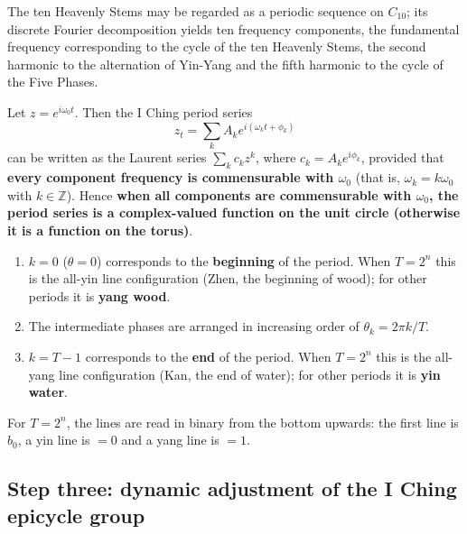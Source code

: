 \begin{example}\label{ex:yijing_tiangan_series}
The ten Heavenly Stems may be regarded as a periodic sequence on $C_{10}$; its discrete Fourier decomposition yields ten frequency components, the fundamental frequency corresponding to the cycle of the ten Heavenly Stems, the second harmonic to the alternation of Yin-Yang and the fifth harmonic to the cycle of the Five Phases.
\end{example}

\begin{remark}\label{rem:yijing_series_complex}
Let $z=e^{i\omega_0t}$. Then the I Ching period series
\[
z_t=\sum_k A_k e^{i(\omega_k t+\phi_k)}
\]
can be written as the Laurent series $\sum_k c_k z^k$, where $c_k=A_k e^{i\phi_k}$, provided that \textbf{every component frequency is commensurable with $\omega_0$} (that is, $\omega_k=k\omega_0$ with $k\in\mathbb Z$). Hence \textbf{when all components are commensurable with $\omega_0$, the period series is a complex-valued function on the unit circle (otherwise it is a function on the torus)}.
\end{remark}

\begin{definition}\label{def:unified_ordering}
\begin{enumerate}[label=(\roman*)]
    \item $k=0$ ($\theta=0$) corresponds to the \textbf{beginning} of the period. When $T=2^n$ this is the all-yin line configuration (Zhen, the beginning of wood); for other periods it is \textbf{yang wood}.
    \item The intermediate phases are arranged in increasing order of $\theta_k = 2\pi k/T$.
    \item $k=T-1$ corresponds to the \textbf{end} of the period. When $T=2^n$ this is the all-yang line configuration (Kan, the end of water); for other periods it is \textbf{yin water}.
\end{enumerate}
For $T=2^n$, the lines are read in binary from the bottom upwards: the first line is $b_0$, a yin line is $=0$ and a yang line is $=1$.
\end{definition}

\subsection{Step three: dynamic adjustment of the I Ching epicycle group}

